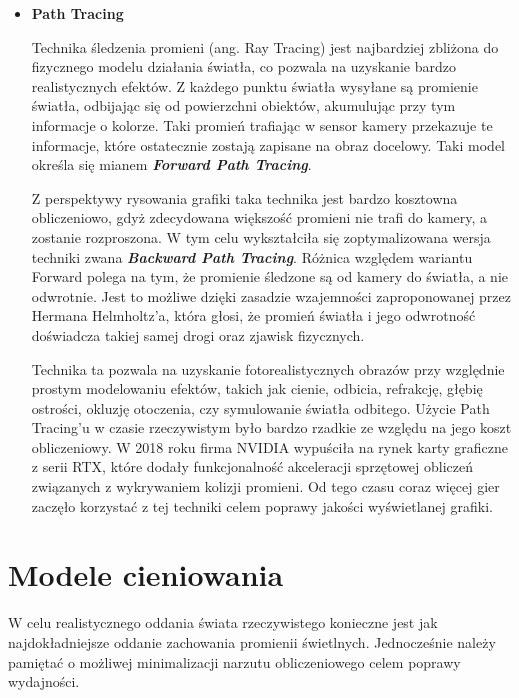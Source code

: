 \begin{itemize}
	\item \textbf{Path Tracing}
	
	Technika śledzenia promieni (ang. Ray Tracing) jest najbardziej zbliżona do fizycznego modelu działania światła, co pozwala na uzyskanie bardzo realistycznych efektów. Z każdego punktu światła wysyłane są promienie światła, odbijając się od powierzchni obiektów, akumulując przy tym informacje o kolorze. Taki promień trafiając w sensor kamery przekazuje te informacje, które ostatecznie zostają zapisane na obraz docelowy. Taki model określa się mianem \emph{\textbf{Forward Path Tracing}}.
	
	Z perspektywy rysowania grafiki taka technika jest bardzo kosztowna obliczeniowo, gdyż zdecydowana większość promieni nie trafi do kamery, a zostanie rozproszona. W tym celu wykształciła się zoptymalizowana wersja techniki zwana \emph{\textbf{Backward Path Tracing}}. Różnica względem wariantu Forward polega na tym, że promienie śledzone są od kamery do światła, a nie odwrotnie. Jest to możliwe dzięki zasadzie wzajemności zaproponowanej przez Hermana Helmholtz'a, która głosi, że promień światła i jego odwrotność doświadcza takiej samej drogi oraz zjawisk fizycznych. \cite{wiki:helmholtz:2024}
	
	Technika ta pozwala na uzyskanie fotorealistycznych obrazów przy względnie prostym modelowaniu efektów, takich jak cienie, odbicia, refrakcję, głębię ostrości, okluzję otoczenia, czy symulowanie światła odbitego. Użycie Path Tracing'u w czasie rzeczywistym było bardzo rzadkie ze względu na jego koszt obliczeniowy. W 2018 roku firma NVIDIA wypuściła na rynek karty graficzne z serii RTX, które dodały funkcjonalność akceleracji sprzętowej obliczeń związanych z wykrywaniem kolizji promieni. Od tego czasu coraz więcej gier zaczęło korzystać z tej techniki celem poprawy jakości wyświetlanej grafiki.
\end{itemize}

\section{Modele cieniowania}

W celu realistycznego oddania świata rzeczywistego konieczne jest jak najdokładniejsze oddanie zachowania promienii świetlnych. Jednocześnie należy pamiętać o możliwej minimalizacji narzutu obliczeniowego celem poprawy wydajności.

